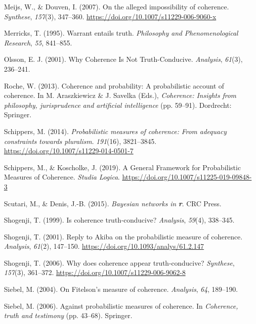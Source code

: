 \documentclass[
  10pt,
]{scrartcl}
\newlength{\cslhangindent}
\newlength{\cslentryspacingunit} %
\newenvironment{CSLReferences}[2] %
 {%
  \setlength{\parindent}{0pt}
  \ifodd #1
  \let\oldpar\par
  \def\par{\hangindent=\cslhangindent\oldpar}
  \fi
  \setlength{\parskip}{#2\cslentryspacingunit}
 }%
 {}
\begin{document}
\begin{CSLReferences}{1}{0}
\leavevmode{}%
Meijs, W., \& Douven, I. (2007). On the alleged impossibility of coherence. \emph{Synthese}, \emph{157}(3), 347--360. \url{https://doi.org/10.1007/s11229-006-9060-x}

\leavevmode{}%
Merricks, T. (1995). Warrant entails truth. \emph{Philosophy and Phenomenological Research}, \emph{55}, 841--855.

\leavevmode{}%
Olsson, E. J. (2001). Why {Coherence Is Not Truth}-{Conducive}. \emph{Analysis}, \emph{61}(3), 236--241.

\leavevmode{}%
Roche, W. (2013). Coherence and probability: A probabilistic account of coherence. In M. Araszkiewicz \& J. Savelka (Eds.), \emph{Coherence: Insights from philosophy, jurisprudence and artificial intelligence} (pp. 59--91). Dordrecht: Springer.

\leavevmode{}%
Schippers, M. (2014). \emph{Probabilistic measures of coherence: From adequacy constraints towards pluralism}. \emph{191}(16), 3821--3845. \url{https://doi.org/10.1007/s11229-014-0501-7}

\leavevmode{}%
Schippers, M., \& Koscholke, J. (2019). A {General Framework} for {Probabilistic Measures} of {Coherence}. \emph{Studia Logica}. \url{https://doi.org/10.1007/s11225-019-09848-3}

\leavevmode{}%
Scutari, M., \& Denis, J.-B. (2015). \emph{Bayesian networks in \textbf{{r}}}. CRC Press.

\leavevmode{}%
Shogenji, T. (1999). Is coherence truth-conducive? \emph{Analysis}, \emph{59}(4), 338--345.

\leavevmode{}%
Shogenji, T. (2001). Reply to {A}kiba on the probabilistic measure of coherence. \emph{Analysis}, \emph{61}(2), 147--150. \url{https://doi.org/10.1093/analys/61.2.147}

\leavevmode{}%
Shogenji, T. (2006). Why does coherence appear truth-conducive? \emph{Synthese}, \emph{157}(3), 361--372. \url{https://doi.org/10.1007/s11229-006-9062-8}

\leavevmode{}%
Siebel, M. (2004). On {F}itelson's measure of coherence. \emph{Analysis}, \emph{64}, 189--190.

\leavevmode{}%
Siebel, M. (2006). Against probabilistic measures of coherence. In \emph{Coherence, truth and testimony} (pp. 43--68). Springer.

\end{CSLReferences}
\end{document}
